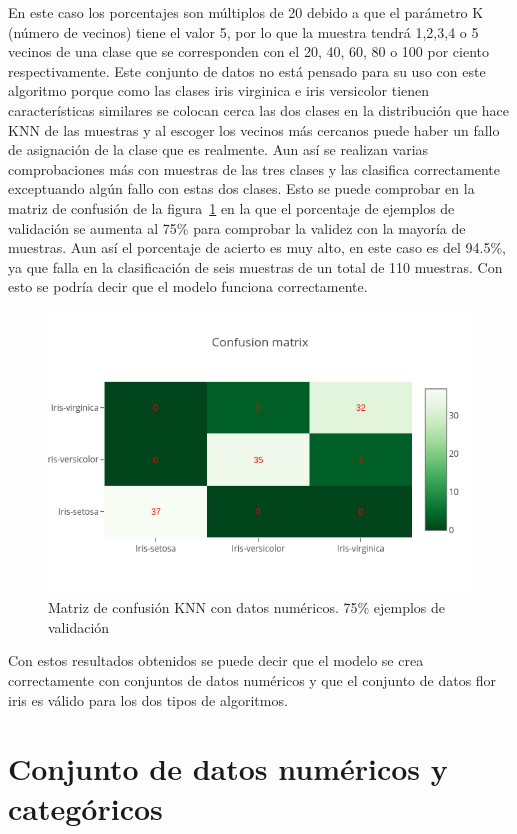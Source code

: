 \documentclass[a4paper, 12pt]{book}
\begin{document}
En este caso los porcentajes son múltiplos de 20 debido a que el parámetro K (número de vecinos) tiene el valor 5, por lo que la muestra tendrá 1,2,3,4 o 5 vecinos de una clase que se corresponden con el 20, 40, 60, 80 o 100 por ciento respectivamente. 
Este conjunto de datos no está pensado para su uso con este algoritmo porque como las clases iris virginica e iris versicolor tienen características similares se colocan cerca las dos clases en la distribución que hace KNN de las muestras y al escoger los vecinos más cercanos puede haber un fallo de asignación de la clase que es realmente. 
Aun así se realizan varias comprobaciones más con muestras de las tres clases y las clasifica correctamente exceptuando algún fallo con estas dos clases. Esto se puede comprobar en la matriz de confusión de la figura~\ref{fig:ejemplo16} en la que el porcentaje de ejemplos de validación se aumenta al 75\% para comprobar la validez con la mayoría de muestras. 
Aun así el porcentaje de acierto es muy alto, en este caso es del 94.5\%, ya que falla en la clasificación de seis muestras de un total de 110 muestras. Con esto se podría decir que el modelo funciona correctamente.

\begin{figure}
	\centering
	\includegraphics[width=12cm, keepaspectratio]{img/cm_num_knn2.png}
	\caption{Matriz de confusión KNN con datos numéricos. 75\% ejemplos de validación} 	
	\label{fig:ejemplo16}
\end{figure}

Con estos resultados obtenidos se puede decir que el modelo se crea correctamente con conjuntos de datos numéricos y que el conjunto de datos flor iris es válido para los dos tipos de algoritmos.

\section{Conjunto de datos numéricos y categóricos}
\label{subsec:numericosycategoricos}
\end{document}
